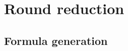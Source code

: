 \chapter{Round reduction}
\label{sec:round_reduction}

\section{Formula generation}
\label{sec:formula_gen}